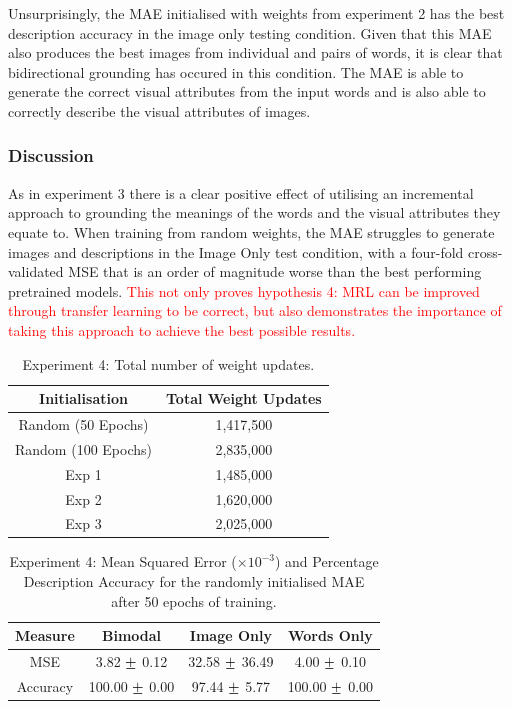 Unsurprisingly, the \ac{MAE} initialised with weights from experiment 2 has the best description accuracy in the image only testing condition. Given that this \ac{MAE} also produces the best images from individual and pairs of words, it is clear that bidirectional grounding has occured in this condition. The \ac{MAE} is able to generate the correct visual attributes from the input words and is also able to correctly describe the visual attributes of images.

\subsubsection{Discussion}
As in experiment 3 there is a clear positive effect of utilising an incremental approach to grounding the meanings of the words and the visual attributes they equate to. 
When training from random weights, the \ac{MAE} struggles to generate images and descriptions in the Image Only test condition, with a four-fold cross-validated \ac{MSE} that is an order of magnitude worse than the best performing pretrained models. \textcolor{red}{This not only proves hypothesis 4: \ac{MRL} can be improved through transfer learning to be correct, but also demonstrates the importance of taking this approach to achieve the best possible results.}

\begin{table}
\centering
\begin{tabular}{|c|c|}
\hline
\textbf{Initialisation} & \textbf{Total Weight Updates}\\ \hline
Random (50 Epochs) &  1,417,500\\ \hline
Random (100 Epochs) & 2,835,000\\ \hline
Exp 1 & 1,485,000\\ \hline
Exp 2 & 1,620,000\\ \hline
Exp 3 &	2,025,000\\ \hline

\end{tabular}
\caption{Experiment 4: Total number of weight updates.}
\label{tab:updatesTotal4}
\end{table}

\begin{table}[h!]
\centering
\begin{tabular}{|c|c|c|c|}
	\hline
	\textbf{Measure} & 	\textbf{Bimodal} & 	\textbf{Image Only} 	& 	\textbf{Words Only} \\ \hline
MSE	&	3.82	$\mypm$	0.12	&	32.58	$\mypm$	36.49	&	4.00	$\mypm$	0.10	\\ \hline
Accuracy	&	100.00	$\mypm$	0.00	&	97.44	$\mypm$	5.77	&	100.00	$\mypm$	0.00\\ \hline
\end{tabular}

\caption{Experiment 4: Mean Squared Error ($\times10^{-3}$) and Percentage Description Accuracy for the randomly initialised MAE after 50 epochs of training.} 
\label{tab:res739_50}
\end{table}

